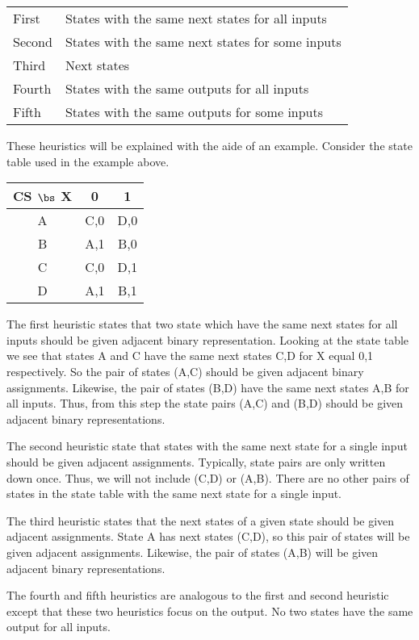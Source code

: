 \begin{tabular}{ll}
    First  & States with the same next states for all inputs \\
    Second & States with the same next states for some inputs \\
    Third  & Next states \\
    Fourth & States with the same outputs for all inputs \\
    Fifth  & States with the same outputs for some inputs \\
\end{tabular}

These heuristics will be explained with the aide of an
example.  Consider the state table used in the example
above.

\begin{tabular} {c||c|c}
    CS $\bs$ X & 0     & 1    \\ \hline \hline
    A       & C,0  & D,0 \\ \hline
    B       & A,1  & B,0 \\ \hline
    C       & C,0  & D,1 \\ \hline
    D       & A,1  & B,1 \\
\end{tabular}

The first heuristic states that two state which have the same
next states for all inputs should be given adjacent binary
representation.  Looking at the state table we see that states
A and C have the same next states C,D for X equal 0,1
respectively.  So the pair of states (A,C) should be given
adjacent binary assignments.  Likewise, the pair of
states (B,D) have the same next states A,B for all inputs.
Thus, from this step the state pairs (A,C) and (B,D) should be
given adjacent binary representations.

The second heuristic state that states with the same next state
for a single input should be given adjacent assignments.  Typically,
state pairs are only written down once.  Thus, we will not include
(C,D) or (A,B).  There are no other pairs of states in the state
table with the same next state for a single input.

The third heuristic states that the next states of a given state
should be given adjacent assignments.  State A has next states
(C,D), so this pair of states will be given adjacent assignments.
Likewise, the pair of states (A,B) will be given adjacent binary
representations.

The fourth and fifth heuristics are analogous to the first and
second heuristic except that these two heuristics focus on the
output.  No two states have the same output for all inputs.

